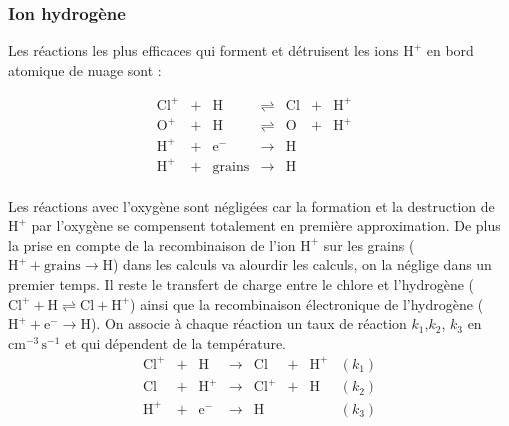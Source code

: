 \subsubsection{Ion hydrogène}

Les réactions les plus efficaces qui forment et détruisent les ions $\mathrm{H}^+$ en bord atomique de nuage sont :

\begin{equation}\label{eq:sysH}
    \begin{array}{lllllllr}
        \mathrm{Cl}^+ & + &\mathrm{H}   & \rightleftharpoons &\mathrm{Cl}  & + & \mathrm{H}^+ &   \\
        \mathrm{O}^+ & + &\mathrm{H}   & \rightleftharpoons &\mathrm{O}  & + & \mathrm{H}^+ &   \\
        \mathrm{H}^+  & + & \mathrm{e}^-  & \rightarrow &\mathrm{H}   &   &  &  \\
        \mathrm{H}^+  & + & \mathrm{grains}  & \rightarrow &\mathrm{H}   &   &  &  \\
    \end{array}
\end{equation}

Les réactions avec l'oxygène sont négligées car la formation et la destruction de $\mathrm{H}^+$ par l'oxygène se compensent totalement en première approximation. De plus la prise en compte de la recombinaison de l'ion $\mathrm{H}^+$ sur les grains ($\mathrm{H}^+  + \mathrm{grains}  \rightarrow \mathrm{H}$) dans les calculs va alourdir les calculs, on la néglige dans un premier temps. Il reste le transfert de charge entre le chlore et l'hydrogène ($\mathrm{Cl}^+  + \mathrm{H}    \rightleftharpoons \mathrm{Cl}   +  \mathrm{H}^+$) ainsi que la recombinaison électronique de l'hydrogène ($\mathrm{H}^+  + \mathrm{e}^-  \rightarrow\mathrm{H}$). On associe à chaque réaction un taux de réaction $k_1$,$k_2$, $k_3$ en $\mathrm{cm}^{-3}\,\mathrm{s}^{-1}$ et qui dépendent de la température.  
\begin{equation}
    \begin{array}{lllllllr}
        \mathrm{Cl}^+ & + &\mathrm{H}   & \rightarrow &\mathrm{Cl}  & + & \mathrm{H}^+ & (k_1) \\
        \mathrm{Cl}  & + & \mathrm{H}^+  & \rightarrow & \mathrm{Cl}^+ & + &\mathrm{H}  & (k_2) \\
        \mathrm{H}^+  & + & \mathrm{e}^-  & \rightarrow &\mathrm{H}   &   &     & (k_3) \\
    \end{array}
\end{equation}

